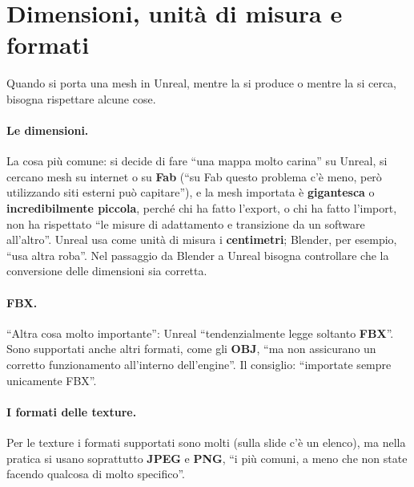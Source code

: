 \section{Dimensioni, unità di misura e formati}
\label{ue3:sec:regole}

Quando si porta una mesh in Unreal, mentre la si produce o mentre la si cerca, bisogna
rispettare alcune cose.

\paragraph{Le dimensioni.} La cosa più comune: si decide di fare ``una mappa molto
carina'' su Unreal, si cercano mesh su internet o su \textbf{Fab} (``su Fab questo
problema c'è meno, però utilizzando siti esterni può capitare''), e la mesh importata è
\textbf{gigantesca} o \textbf{incredibilmente piccola}, perché chi ha fatto l'export, o
chi ha fatto l'import, non ha rispettato ``le misure di adattamento e transizione da un
software all'altro''. Unreal usa come unità di misura i \textbf{centimetri}; Blender,
per esempio, ``usa altra roba''. Nel passaggio da Blender a Unreal bisogna controllare
che la conversione delle dimensioni sia corretta.

\paragraph{FBX.} ``Altra cosa molto importante'': Unreal ``tendenzialmente legge
soltanto \textbf{FBX}''. Sono supportati anche altri formati, come gli \textbf{OBJ}, ``ma
non assicurano un corretto funzionamento all'interno dell'engine''. Il consiglio:
``importate sempre unicamente FBX''.

\paragraph{I formati delle texture.} Per le texture i formati supportati sono molti
(sulla slide c'è un elenco), ma nella pratica si usano soprattutto \textbf{JPEG} e
\textbf{PNG}, ``i più comuni, a meno che non state facendo qualcosa di molto
specifico''.

